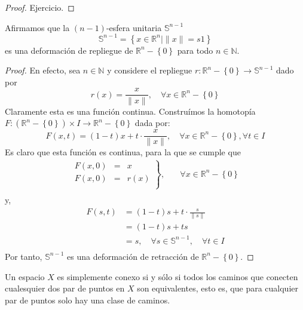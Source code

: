 \documentclass[12pt]{report}
\theoremstyle{largebreak}
\newcommand\cf[3]{\ensuremath{#1:#2\rightarrow#3}}
\begin{document}
    \begin{proof}
        Ejercicio.
    \end{proof}

    \begin{exa}
        Afirmamos que la $(n-1)$-esfera unitaria $\mathbb{S}^{ n-1}$
        \begin{equation*}
            \mathbb{S}^{ n-1}=\left\{x\in\mathbb{R}^n\Big|\|x\|=s1 \right\}
        \end{equation*}
        es una deformación de repliegue de $\mathbb{R}^n-\left\{0\right\}$ para todo $n\in\mathbb{N}$.
    \end{exa}

    \begin{proof}
        En efecto, sea $n\in\mathbb{N}$ y considere el repliegue $\cf{r}{\mathbb{R}^n-\left\{0\right\}}{\mathbb{S}^{ n-1}}$ dado por
        \begin{equation*}
            r(x)=\frac{x}{\|x\|},\quad\forall x\in\mathbb{R}^n-\left\{0\right\}
        \end{equation*}
        Claramente esta es una función continua. Construímos la homotopía $\cf{F}{(\mathbb{R}^n-\left\{0\right\})\times I}{\mathbb{R}^n-\left\{0\right\}}$ dada por:
        \begin{equation*}
            F(x,t)=(1-t)x+t\cdot\frac{x}{\|x\|},\quad\forall x\in \mathbb{R}^n-\left\{0\right\}, \forall t\in I
        \end{equation*}
        Es claro que esta función es continua, para la que se cumple    que
        \begin{equation*}
            \begin{split}
                \left.
                    \begin{array}{rcl}
                        F(x,0) & = & x\\
                        F(x,0) & = & r(x)\\
                    \end{array}
                \right\},&\quad\forall x\in\mathbb{R}^n-\left\{0\right\}\\
            \end{split}
        \end{equation*}
        y,
        \begin{equation*}
            \begin{split}
                F(s,t)&=(1-t)s+t\cdot\frac{s}{\|s\|}\\
                &=(1-t)s+ts\\
                &=s,\quad\forall s\in\mathbb{S}^{ n-1},\quad\forall t\in I \\
            \end{split}
        \end{equation*}
        Por tanto, $\mathbb{S}^{ n-1}$ es una deformación de retracción de $\mathbb{R}^n-\left\{0\right\}$.
    \end{proof}
    \begin{propo}
        Un espacio $X$ es simplemente conexo si y sólo si todos los caminos que conecten cualesquier dos par de puntos en $X$ son equivalentes, esto es, que para cualquier par de puntos solo hay una clase de caminos.
    \end{propo}
\end{document}
